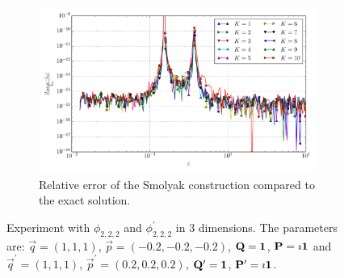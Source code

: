 \documentclass[a4paper,10pt]{article}
\begin{document}
\begin{figure}[ht!]
\begin{subfigure}[t]{0.5\linewidth}
    \includegraphics[width=\linewidth]{./plots/tp_sg_3d_conv_eps_(2,2,2)_(2,2,2)_err_rel_nsd_gk.pdf}
    \caption{Relative error of the Smolyak construction compared to the exact solution.}
    \label{fig:tp_sg_3d_conv_p_222_222_err_rel_nsd_gk}
  \end{subfigure}
  \label{fig:tp_sg_3d_conv_p_222_222}
  \caption{Experiment with $\phi_{2,2,2}$ and $\phi_{2,2,2}^{\prime}$
  in 3 dimensions.
  The parameters are:
  $\vec{q} = (1, 1, 1)$,
  $\vec{p} = (-0.2, -0.2, -0.2)$,
  $\mathbf{Q} = \mathbf{1}$,
  $\mathbf{P} = \imath \mathbf{1}$
  and
  $\vec{q}^\prime = (1, 1, 1)$,
  $\vec{p}^\prime = (0.2, 0.2, 0.2)$,
  $\mathbf{Q}^\prime = \mathbf{1}$,
  $\mathbf{P}^\prime = \imath \mathbf{1}$.}
\end{figure}
\end{document}
